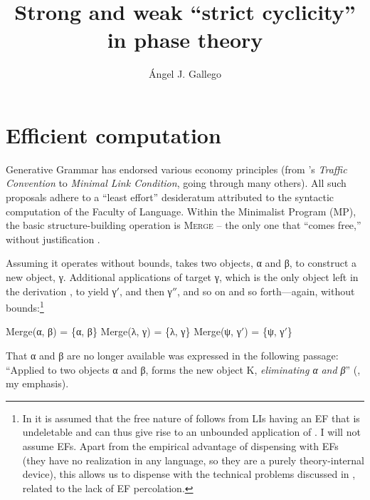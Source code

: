 \documentclass[output=paper]{langsci/langscibook}
\author{Ángel J. Gallego\affiliation{Universitat Autònoma de Barcelona}}
\title{Strong and weak \enquote{strict cyclicity} in phase theory}
\begin{document}
\glsresetall

\section{Efficient computation}

Generative Grammar has endorsed various economy principles (from
\citeauthor{Chomsky1955}’s \citeyear{Chomsky1955} \emph{Traffic Convention}
to  \emph{Minimal Link Condition}, going through many
others).  All such proposals adhere to a “least effort” desideratum attributed
to the syntactic computation of the Faculty of Language.  Within the Minimalist
Program (\gls{MP}), the basic structure-building operation is
\textsc{Merge} -- the only one that “comes free,” without justification
\parencites[3]{Chomsky2001}[137]{Chomsky2008}.

\largerpage
Assuming it operates without bounds,  takes two objects, α and β, to
construct a new object, γ. Additional applications of  target γ, which is
the only object left in the derivation \citep[243]{Chomsky1995}, to yield γ$'$,
and then γ$''$, and so on and so forth—again, without bounds:\footnote{In
    \textcites[11]{Chomsky2007}[139]{Chomsky2008} it is assumed that the free
    nature of  follows from LIs having an \textsc{\gls{EF}} that is
    undeletable and can thus give rise to an unbounded application of
    .  I will not assume \glspl{EF}. Apart from the empirical
    advantage of dispensing with \glspl{EF} (they have no realization in any
    language, so they are a purely theory-internal device), this allows us to
    dispense with the technical problems discussed in \citet{Narita2014},
    related to the lack of \gls{EF} percolation.}

\ea%
    \label{ex:key:34.1}
    \ea Merge(α, β) = \{α, β\}
    \ex Merge(λ, γ) = \{λ, γ\}
    \ex Merge(ψ, γ$'$) = \{ψ, γ$'$\}
    \z
\z

That α and β are no longer available was expressed in the following passage:
“Applied to two objects α and β,  forms the new object K,
\emph{eliminating α} \emph{and β}” (\citealt[243]{Chomsky1995}, my emphasis).
\end{document}
